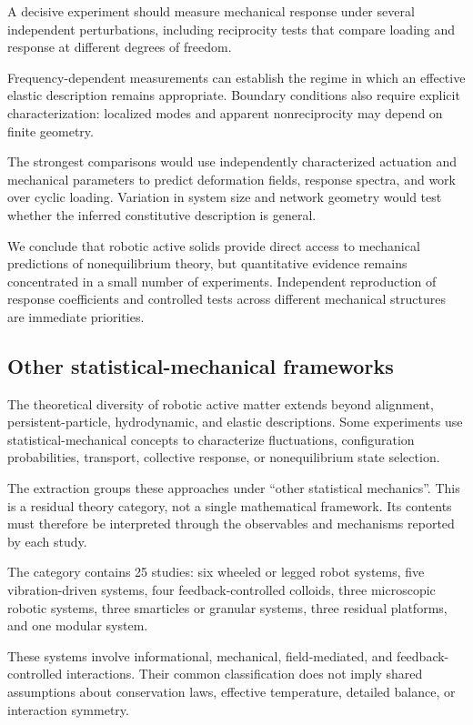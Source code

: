 A decisive experiment should measure
mechanical response under several
independent perturbations, including
reciprocity tests that compare
loading and response at different
degrees of freedom.

Frequency-dependent measurements
can establish the regime in which
an effective elastic description
remains appropriate. Boundary
conditions also require explicit
characterization: localized modes
and apparent nonreciprocity
may depend on finite geometry.

The strongest comparisons would
use independently characterized
actuation and mechanical parameters
to predict deformation fields,
response spectra, and work
over cyclic loading.
Variation in system size and
network geometry would test
whether the inferred constitutive
description is general.

We conclude that robotic active
solids provide direct access
to mechanical predictions
of nonequilibrium theory,
but quantitative evidence
remains concentrated in
a small number of experiments.
Independent reproduction of
response coefficients and
controlled tests across
different mechanical structures
are immediate priorities.

\subsection{Other statistical-mechanical frameworks}
\label{sec:theory-statistical}

The theoretical diversity of robotic active matter
extends beyond alignment, persistent-particle,
hydrodynamic, and elastic descriptions.
Some experiments use statistical-mechanical
concepts to characterize fluctuations,
configuration probabilities, transport,
collective response, or nonequilibrium
state selection.

The extraction groups these approaches
under ``other statistical mechanics''.
This is a residual theory category,
not a single mathematical framework.
Its contents must therefore be interpreted
through the observables and mechanisms
reported by each study.

The category contains 25 studies:
six wheeled or legged robot systems,
five vibration-driven systems,
four feedback-controlled colloids,
three microscopic robotic systems,
three smarticles or granular systems,
three residual platforms,
and one modular system.

These systems involve informational,
mechanical, field-mediated, and
feedback-controlled interactions.
Their common classification does not
imply shared assumptions about
conservation laws, effective temperature,
detailed balance, or interaction symmetry.

